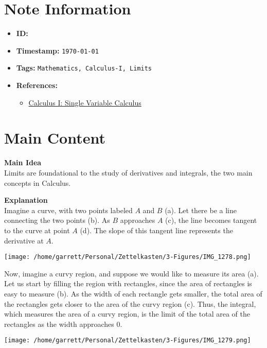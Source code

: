 \clearpage
{}
\label{202501050700}
\renewcommand{\notetitle}{Motivation for Limits}

\section*{Note Information}
\begin{itemize}
  \item \textbf{ID:} \texttt{\jobname}
  \item \textbf{Timestamp:} \texttt{\today \ \currenttime}
  \item \textbf{Tags:} \texttt{Mathematics, Calculus-I, Limits}
  \item \textbf{References:}
    \begin{itemize}
      \item \href{https://ocw.mit.edu/courses/18-01-calculus-i-single-variable-calculus-fall-2020/}{Calculus I: Single Variable Calculus}
    \end{itemize}
\end{itemize}


\section*{Main Content}
\textbf{Main Idea}\\
Limits are foundational to the study of derivatives and integrals, the two main concepts in Calculus. 

\textbf{Explanation}\\
Imagine a curve, with two points labeled $A$ and $B$ (a). Let there be a line connecting the two points (b).
As $B$ approaches $A$ (c), the line becomes tangent to the curve at point $A$ (d). The slope of this tangent line represents the derivative at $A$.\\
\begin{center}
  \texttt{[image: /home/garrett/Personal/Zettelkasten/3-Figures/IMG\_1278.png]}
\end{center}
Now, imagine a curvy region, and suppose we would like to measure its area (a). Let us start by filling the region with rectangles, since the area of rectangles is easy to measure (b).
As the width of each rectangle gets smaller, the total area of the rectangles gets closer to the area of the curvy region (c). Thus, the integral, which measures the area of a curvy region, 
is the limit of the total area of the rectangles as the width approaches 0.\\
\begin{center}
  \texttt{[image: /home/garrett/Personal/Zettelkasten/3-Figures/IMG\_1279.png]}
\end{center}

